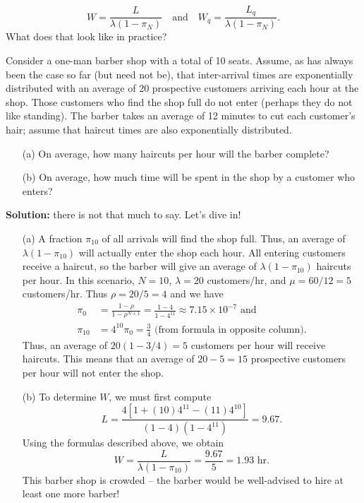 $$ W = \frac{L}{\lambda\left(1-\pi_{N}\right)}\quad \text{and}\quad W_{q} = \frac{L_{q}}{\lambda\left(1-\pi_{N}\right)}.$$
What does that look like in practice? 
\begin{Exemple} Consider a one-man barber shop with a total of 10 seats. Assume, as has always been the case so far (but need not be), that inter-arrival times are exponentially distributed with an average of 20 prospective customers arriving each hour at the shop. Those customers who find the shop full do not enter (perhaps they do not like standing). The barber takes an average of 12 minutes to cut each customer's hair; assume that haircut times are also exponentially distributed.
\begin{itemize}[noitemsep]
	\item[(a)] On average, how many haircuts per hour will the barber complete?
	\item[(b)] On average, how much time will be spent in the shop by a customer who enters?
\end{itemize}
\textbf{Solution:} there is not that much to say. Let's dive in!
\begin{itemize}[noitemsep]
	\item[(a)] A fraction $\pi_{10}$ of all arrivals will find the shop full. Thus, an average of $\lambda\left(1-\pi_{10}\right)$ will actually enter the shop each hour.  All entering customers receive a haircut, so the barber will give an average of $\lambda\left(1-\pi_{10}\right)$ haircuts per hour. In this scenario, $N=10$, $\lambda=20$ customers/hr, and $\mu=60/12 = 5 $ customers/hr. Thus $\rho= 20/5 = 4$ and  we have 
	\begin{align*} \pi_{0} &= \frac{1-\rho}{1-\rho^{N+1}} = \frac{1-4}{1-4^{11}}\approx 7.15\times 10^{-7}  \text{ and} \\ \pi_{10} &= 4^{10} \pi_{0} = \frac{3}{4} \text{ (from formula in opposite column)}.\end{align*}
Thus, an average of $20(1 - 3/4)= 5$ customers per hour will receive haircuts. This means that an average of $20 - 5 = 15$ prospective customers per hour will not enter the shop.	
\item[(b)] To determine $W$, we must first compute 
$$L = \frac{4 [1+ (10) 4^{11} - (11) 4^{10} ]}{(1-4)\left(1-4^{11}\right)} = 9.67.$$ 
Using the formulas described above, we obtain 
$$ W = \frac{L}{\lambda\left(1-\pi_{10}\right)} = \frac{9.67}{5} = 1.93 \text{ hr}.$$
This barber shop is crowded -- the barber would be well-advised to hire at least one more barber!
\end{itemize}
\end{Exemple}
